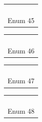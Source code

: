 \begin{flushleft}
\begin{tabular}[t]{|c|c|c|c|c|}
  \hline
  & & & &  \\
  \hline
  & & & \cellcolor{blue}&  \\
  \hline
  & \cellcolor{blue} &  \cellcolor{blue}& \cellcolor{blue} &   \\
  \hline
  & & & &  \\
  \hline
  & & & &  \\
  \hline
  \multicolumn{5}{c}{Enum 45}\\
\end{tabular}
\hspace{3cm}
\begin{tabular}[t]{|c|c|c|c|c|}
  \hline
  & & & &  \\
  \hline
  &\cellcolor{blue} & \cellcolor{blue} &\cellcolor{blue} &  \\
  \hline
  & &  &\cellcolor{blue} &  \\
  \hline
  & &  & &  \\
  \hline
  & & & &  \\
  \hline
  \multicolumn{5}{c}{Enum 46}\\
\end{tabular}
\hspace{3cm}
\begin{tabular}[t]{|c|c|c|c|c|}
  \hline
  & & & &  \\
  \hline
  & \cellcolor{blue}&  & &  \\
  \hline
  & \cellcolor{blue}&\cellcolor{blue} &\cellcolor{blue} &  \\
  \hline
  & &  & &  \\
  \hline
  & & & &  \\
  \hline
  \multicolumn{5}{c}{Enum 47}\\
\end{tabular}
\end{flushleft}
\hspace{5.32cm}
  \begin{tabular}[t]{|c|c|c|c|c|}
  \hline
  & & & &  \\
  \hline
  & \cellcolor{blue}&\cellcolor{blue} &\cellcolor{blue} &  \\
  \hline
  & \cellcolor{blue}&  & &  \\
  \hline
  & &  & &  \\
  \hline
  & & & &  \\
  \hline
  \multicolumn{5}{c}{Enum 48}\\
  \end{tabular}
